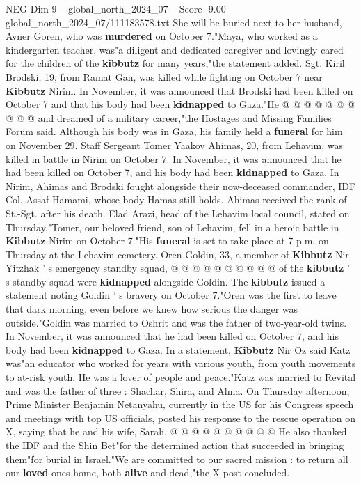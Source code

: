 \begin{textsample}{NEG Dim 9 – global\_north\_2024\_07 – Score -9.00 – global\_north\_2024\_07/111183578.txt}
She will be buried next to her husband, Avner Goren, who was \textbf{murdered} on October 7."Maya, who worked as a kindergarten teacher, was"a diligent and dedicated caregiver and lovingly cared for the children of the \textbf{kibbutz} for many years,"the statement added.
Sgt.
Kiril Brodski, 19, from Ramat Gan, was killed while fighting on October 7 near \textbf{Kibbutz} Nirim.
In November, it was announced that Brodski had been killed on October 7 and that his body had been \textbf{kidnapped} to Gaza."He @ @ @ @ @ @ @ @ @ @ and dreamed of a military career,"the Hostages and Missing Families Forum said.
Although his body was in Gaza, his family held a \textbf{funeral} for him on November 29.
Staff Sergeant Tomer Yaakov Ahimas, 20, from Lehavim, was killed in battle in Nirim on October 7.
In November, it was announced that he had been killed on October 7, and his body had been \textbf{kidnapped} to Gaza.
In Nirim, Ahimas and Brodski fought alongside their now-deceased commander, IDF Col.
Assaf Hamami, whose body Hamas still holds.
Ahimas received the rank of St.-Sgt. after his death.
Elad Arazi, head of the Lehavim local council, stated on Thursday,"Tomer, our beloved friend, son of Lehavim, fell in a heroic battle in \textbf{Kibbutz} Nirim on October 7."His \textbf{funeral} is set to take place at 7 p.m. on Thursday at the Lehavim cemetery.
Oren Goldin, 33, a member of \textbf{Kibbutz} Nir Yitzhak ' s emergency standby squad, @ @ @ @ @ @ @ @ @ @ of the \textbf{kibbutz} ' s standby squad were \textbf{kidnapped} alongside Goldin.
The \textbf{kibbutz} issued a statement noting Goldin ' s bravery on October 7."Oren was the first to leave that dark morning, even before we knew how serious the danger was outside."Goldin was married to Oshrit and was the father of two-year-old twins.
In November, it was announced that he had been killed on October 7, and his body had been \textbf{kidnapped} to Gaza.
In a statement, \textbf{Kibbutz} Nir Oz said Katz was"an educator who worked for years with various youth, from youth movements to at-risk youth.
He was a lover of people and peace."Katz was married to Revital and was the father of three : Shachar, Shira, and Alma.
On Thursday afternoon, Prime Minister Benjamin Netanyahu, currently in the US for his Congress speech and meetings with top US officials, posted his response to the rescue operation on X, saying that he and his wife, Sarah, @ @ @ @ @ @ @ @ @ @ He also thanked the IDF and the Shin Bet"for the determined action that succeeded in bringing them"for burial in Israel."We are committed to our sacred mission : to return all our \textbf{loved} ones home, both \textbf{alive} and dead,"the X post concluded.

\end{textsample}
